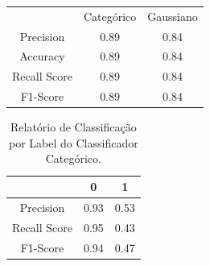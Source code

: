 \documentclass[conference]{IEEEtran}
\begin{document}
\begin{table}[H]
	\centering
    \begin{small}
        \begin{tabular}{ccc}
        	\\
        	\\
            \hline
                                    & Categórico       & Gaussiano\\
            \hline
            Precision               & 0.89             & 0.84\\
            Accuracy                & 0.89             & 0.84\\
            Recall Score            & 0.89             & 0.84\\
            F1-Score                & 0.89             & 0.84\\
            
            \hline
        \end{tabular}
    \end{small}
\end{table}

\begin{table}[H]

	\centering
    \caption{\label{tab:cr1-cnb} Relatório de Classificação por Label do Classificador Categórico.}
    \begin{small}
        \begin{tabular}{ccc}
        
            \hline
                                    & 0                & 1\\
            \hline
            Precision               & 0.93             & 0.53\\
            Recall Score            & 0.95             & 0.43\\
            F1-Score                & 0.94             & 0.47\\
            
            \hline
        \end{tabular}
    \end{small}

\end{table}
\end{document}

